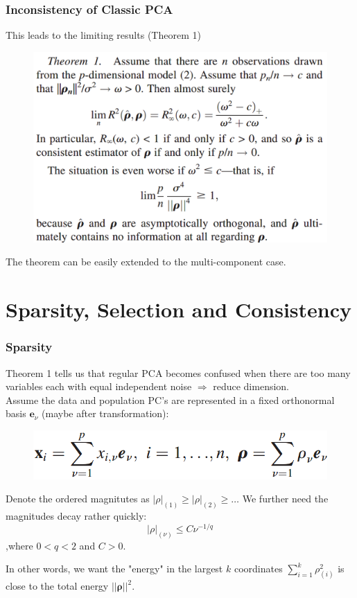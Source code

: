 \documentclass{beamer}
\begin{document}
	
	\begin{frame}
		\frametitle{Inconsistency of Classic PCA}
		This leads to the limiting results (Theorem 1)
		\begin{figure}
			\includegraphics[width=0.8\linewidth]{image002.png}
		\end{figure}
		The theorem can be easily extended to the multi-component case.
	\end{frame}
	
	\section{Sparsity, Selection and Consistency}
	\begin{frame}
		\frametitle{Sparsity}
		Theorem 1 tells us that regular PCA becomes confused when there are too many variables each with equal independent noise $\Rightarrow$ reduce dimension.\\
		Assume the data and population PC's are represented in a fixed orthonormal basis  ${\bm{e}_{\nu}}$ (maybe after transformation):
		\begin{figure}
			\includegraphics[width=0.5\linewidth]{image003.png}
		\end{figure}
		Denote the ordered magnitutes as $|\rho|_{(1)} \geq |\rho|_{(2)} \geq \ldots$ We further need the magnitudes decay rather quickly:
		$$|\rho|_{(\nu)} \leq C\nu^{-1/q}$$
		,where $0<q<2$ and $C>0$.
		
		In other words, we want the "energy" in the largest $k$ coordinates $\sum_{i=1}^{k}\rho^2_{(i)}$ is close to the total energy $||\bm{\rho}||^2$.
	\end{frame}
	
\end{document}
